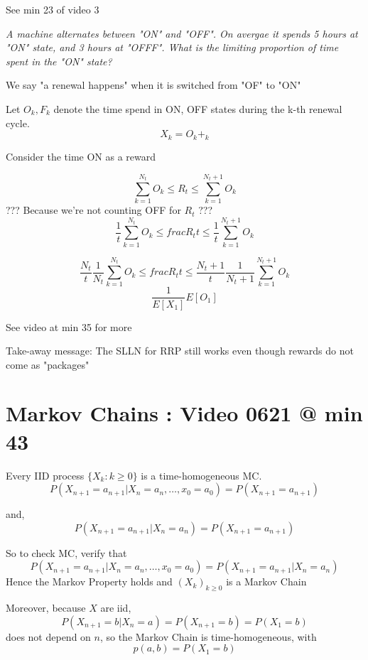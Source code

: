 \documentclass{report}
\begin{document}
   {
    See min 23 of video 3

    \textit{A machine alternates between "ON" and "OFF".  On avergae it
    spends 5 hours at "ON" state, and 3 hours at "OFFF".  What is the
  limiting proportion of time spent in the "ON" state?}

    We say "a renewal happens" when it is switched from "OF" to "ON"

    Let $O_k, F_k$ denote the time spend in ON, OFF states during the k-th
    renewal cycle.
    \[ X_k = O_k + _k \]

    Consider the time ON as a reward

    \[ \sum^{N_t}_{k=1} O_k \leq R_t \leq \sum^{N_t+1}_{k=1} O_k \]
    ??? Because we're not counting OFF for $R_t$ ???
    \[ \frac{1}{t} \sum^{N_t}_{k=1} O_k \leq frac{R_t}{t} \leq \frac{1}{t} \sum^{N_t+1}_{k=1} O_k \]

   \[ \frac{N_t}{t} \frac{1}{N_t} \sum^{N_t}_{k=1} O_k \leq frac{R_t}{t} \leq \frac{N_t+1}{t} \frac{1}{N_t+1} \sum^{N_t+1}_{k=1} O_k \]
    \[ \frac{1}{E[X_1]} E[O_1]  \]

    See video at min 35 for more

  }

  Take-away message:  The SLLN  for RRP still works even though rewards
  do not come as "packages"

  \section*{Markov Chains : Video 0621 @ min 43}%
   {
    Every IID process $\{X_k: k \geq 0\}$ is a time-homogeneous MC.
    \[ P(X_{n+1} = a_{n+1} | X_n=a_n, \dots , x_0 = a_0) = 
    P(X_{n+1}=a_{n+1}) \]

    and,
    \[ P(X_{n+1} = a_{n+1} | X_n=a_n) = P(X_{n+1}=a_{n+1}) \]

    So to check MC, verify that 
    \[ P(X_{n+1} = a_{n+1} | X_n=a_n, \dots , x_0 = a_0) = 
     P(X_{n+1} = a_{n+1} | X_n=a_n) \]
   Hence the Markov Property holds and $(X_k)_{k \geq 0}$ is a Markov Chain

   Moreover, because $X$ are iid,
   \[ P(X_{n+1} = b | X_n = a) = P(X_{n+1}=b) =  P(X_1=b) \]
   does not depend on $n$, so the Markov Chain is time-homogeneous, with
   \[ p(a,b) = P(X_1 = b) \]
  }
  
\end{document}
